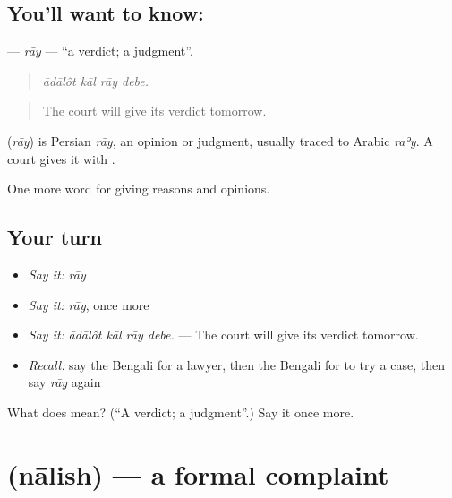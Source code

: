\subsection*{You'll want to know: }
\textbf{} — \emph{rāy} — \textquotedblleft{}a verdict; a judgment\textquotedblright{}.

\begin{quote}
   
\end{quote}

\begin{quote}
\emph{ādālôt kāl rāy debe.}
\end{quote}

\begin{quote}
The court will give its verdict tomorrow.
\end{quote}

\begin{cousinweb}
\textbf{} (\emph{rāy}) is Persian \emph{rāy}, an opinion or judgment, usually traced to Arabic \emph{raʾy}. A court gives it with .
\end{cousinweb}

\begin{grammarlens}[title={What you've built}]
One more word for giving reasons and opinions.
\end{grammarlens}

\subsection*{Your turn}
\begin{itemize}
\raggedright
  \item \emph{Say it:} \emph{rāy}
  \item \emph{Say it:} \emph{rāy}, once more
  \item \emph{Say it:} \emph{ādālôt kāl rāy debe.} — The court will give its verdict tomorrow.
  \item \emph{Recall:} say the Bengali for a lawyer, then the Bengali for to try a case, then say \emph{rāy} again
\end{itemize}

\begin{tcolorbox}[breakable,colback=teal!4,colframe=teal!35!black,title={Before you move on}]
What does  mean? (\textquotedblleft{}A verdict; a judgment\textquotedblright{}.) Say it once more.
\end{tcolorbox}
\section[\texorpdfstring{\bn{নালিশ} (nālish)}{নালিশ (nālish)}]{ (nālish) — a formal complaint}

